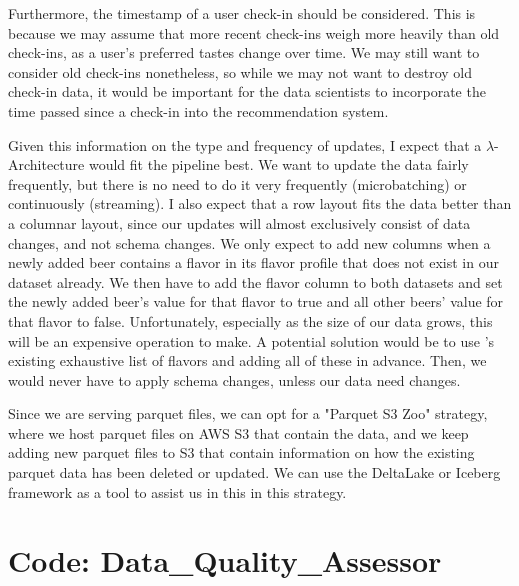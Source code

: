 \documentclass[sigconf]{acmart}
\begin{document}
Furthermore, the timestamp of a user check-in should be considered.
This is because we may assume that more recent check-ins weigh more heavily than old check-ins, as a user's preferred tastes change over time.
We may still want to consider old check-ins nonetheless, so while we may not want to destroy old check-in data, it would be important for the data scientists to incorporate the time passed since a check-in into the recommendation system.

Given this information on the type and frequency of updates, I expect that a $\lambda$-Architecture would fit the pipeline best.
We want to update the data fairly frequently, but there is no need to do it very frequently (microbatching) or continuously (streaming).
I also expect that a row layout fits the data better than a columnar layout, since our updates will almost exclusively consist of data changes, and not schema changes.
We only expect to add new columns when a newly added beer contains a flavor in its flavor profile that does not exist in our dataset already.
We then have to add the flavor column to both datasets and set the newly added beer's value for that flavor to true and all other beers' value for that flavor to false.
Unfortunately, especially as the size of our data grows, this will be an expensive operation to make.
A potential solution would be to use \citeauthor{untappd}'s existing exhaustive list of flavors and adding all of these in advance.
Then, we would never have to apply schema changes, unless our data need changes.

Since we are serving parquet files, we can opt for a "Parquet S3 Zoo" strategy, where we host parquet files on AWS S3 that contain the data, and we keep adding new parquet files to S3 that contain information on how the existing parquet data has been deleted or updated.
We can use the DeltaLake or Iceberg framework as a tool to assist us in this in this strategy.




\onecolumn
\appendix

\section{Code: Data\_Quality\_Assessor}
\label{sec:dataqualityassessor}
\end{document}
